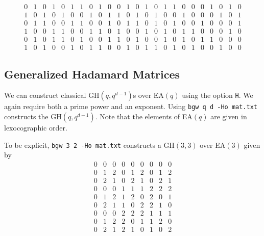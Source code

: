 \documentclass[a4paper,10pt]{article}
\begin{document}
\[\begin{array}{rrrrrrrrrrrrrrrrrrrrrrrr}
0 & 1 & 0 & 1 & 0 & 1 & 1 & 0 & 1 & 0 & 0 & 1 & 0 & 1 & 0 & 1 & 1 & 0 & 0 & 0 & 1 & 0 & 1 & 0 \\
1 & 0 & 1 & 0 & 1 & 0 & 0 & 1 & 0 & 1 & 1 & 0 & 1 & 0 & 1 & 0 & 0 & 1 & 0 & 0 & 0 & 1 & 0 & 1 \\
0 & 1 & 1 & 0 & 0 & 1 & 1 & 0 & 0 & 1 & 0 & 1 & 1 & 0 & 1 & 0 & 1 & 0 & 0 & 1 & 0 & 0 & 0 & 1 \\
1 & 0 & 0 & 1 & 1 & 0 & 0 & 1 & 1 & 0 & 1 & 0 & 0 & 1 & 0 & 1 & 0 & 1 & 1 & 0 & 0 & 0 & 1 & 0 \\
0 & 1 & 0 & 1 & 1 & 0 & 1 & 0 & 0 & 1 & 1 & 0 & 1 & 0 & 0 & 1 & 0 & 1 & 0 & 1 & 1 & 0 & 0 & 0 \\
1 & 0 & 1 & 0 & 0 & 1 & 0 & 1 & 1 & 0 & 0 & 1 & 0 & 1 & 1 & 0 & 1 & 0 & 1 & 0 & 0 & 1 & 0 & 0
\end{array}
\]

\subsection{\sc Generalized Hadamard Matrices}
We can construct classical GH$(q,q^{d-1})$s over EA$(q)$ using the option {\tt H}. We again require both a prime power and an exponent. Using {\tt bgw q d -Ho mat.txt} constructs the GH$(q,q^{d-1})$. Note that the elements of EA$(q)$ are given in lexocographic order.

To be explicit, {\tt bgw 3 2 -Ho mat.txt} constructs a GH$(3,3)$ over EA$(3)$ given by
\[
 \begin{array}{rrrrrrrrr}
0 & 0 & 0 & 0 & 0 & 0 & 0 & 0 & 0 \\
0 & 1 & 2 & 0 & 1 & 2 & 0 & 1 & 2 \\
0 & 2 & 1 & 0 & 2 & 1 & 0 & 2 & 1 \\
0 & 0 & 0 & 1 & 1 & 1 & 2 & 2 & 2 \\
0 & 1 & 2 & 1 & 2 & 0 & 2 & 0 & 1 \\
0 & 2 & 1 & 1 & 0 & 2 & 2 & 1 & 0 \\
0 & 0 & 0 & 2 & 2 & 2 & 1 & 1 & 1 \\
0 & 1 & 2 & 2 & 0 & 1 & 1 & 2 & 0 \\
0 & 2 & 1 & 2 & 1 & 0 & 1 & 0 & 2
\end{array}
\]
\end{document}
